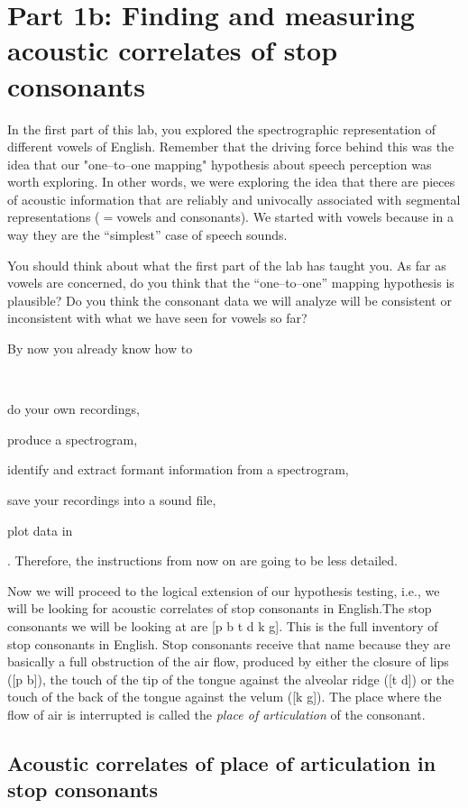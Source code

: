 \section{Part 1b: Finding and measuring acoustic correlates of stop consonants}

In the first part of this lab, you explored the spectrographic representation of different vowels of English. Remember that the driving force behind this was the idea that our "one--to--one mapping" hypothesis about speech perception was worth exploring. In other words, we were exploring the idea that there are pieces of acoustic information that are reliably and univocally associated with segmental representations ($=$vowels and consonants). We started with vowels because in a way they are the ``simplest'' case of speech sounds.

You should think about what the first part of the lab has taught you. As far as vowels are concerned, do you think  that the ``one--to--one'' mapping hypothesis is plausible? Do you think the consonant data we will analyze will be consistent or inconsistent with what we have seen for vowels so far?

By now you already know how to\begin{inparaenum}[(a)]~\item do your own recordings, \item produce a spectrogram, \item identify and extract formant information from a spectrogram, \item save your recordings into a sound file, \item plot data in \MSExcel{}\end{inparaenum}. Therefore, the instructions from now on are going to be less detailed.

Now we will proceed to the logical extension of our hypothesis testing, i.e., we will be looking for acoustic correlates of stop consonants in English.The stop consonants we will be looking at are [p b t d k g]. This is the full inventory of stop consonants in English. Stop consonants receive that name because they are basically a full obstruction of the air flow, produced by either the closure of lips ([p b]), the touch of the tip of the tongue against the alveolar ridge ([t d]) or the touch of the back of the tongue against the velum ([k g]). The place where the flow of air is interrupted is called the \emph{place of articulation} of the consonant.

\subsection{Acoustic correlates of place of articulation in stop consonants}

